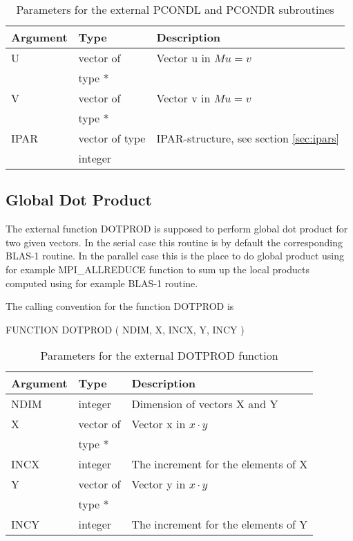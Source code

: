 \documentclass[11pt,a4paper,english,oneside]{report}
\begin{document}
\begin{table}[H]
\begin{tabular*}{\textwidth}{lll}
\hline\hline
{\bfseries Argument} & {\bfseries Type} & {\bfseries Description} \\
\hline
U	& vector of 		& Vector u in $Mu = v$ \\
	& type $*$		& \\
V 	& vector of		& Vector v in $Mu = v$ \\
	& type $*$		& \\
IPAR	& vector of type	& IPAR-structure, see section \ref{sec:ipars} \\
	& integer		& \\
\hline\hline
\end{tabular*}
\caption{Parameters for the external PCONDL and PCONDR subroutines}
\label{table:pcond-param}
\end{table}

\subsection{Global Dot Product}

The external function {\ttfamily DOTPROD} is supposed to perform global
dot product for two given vectors. In the serial case this routine
is by default the corresponding BLAS-1 routine. In the parallel case
this is the place to do global product using for example
{\ttfamily MPI\_ALLREDUCE} function to sum up the local products
computed using for example BLAS-1 routine.

The calling convention for the function {\ttfamily DOTPROD} is

\bigskip
\noindent
{\ttfamily FUNCTION DOTPROD ( NDIM, X, INCX, Y, INCY )}
\bigskip

\begin{table}[H]
\begin{tabular*}{\textwidth}{lll}
\hline\hline
{\bfseries Argument} & {\bfseries Type} & {\bfseries Description} \\
\hline
NDIM	& integer		& Dimension of vectors X and Y\\
X	& vector of 		& Vector x in $x \cdot y$ \\
	& type $*$		& \\
INCX	& integer		& The increment for the elements of X \\
Y 	& vector of		& Vector y in $x \cdot y$ \\
	& type $*$		& \\
INCY	& integer		& The increment for the elements of Y \\
\hline\hline
\end{tabular*}
\caption{Parameters for the external DOTPROD function}
\label{table:dotprod-param}
\end{table}
\end{document}
